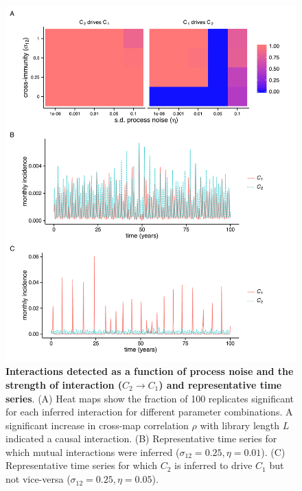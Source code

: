 \documentclass[10pt]{article}
\begin{document}
\begin{figure}
\begin{center}
  \includegraphics[width=5in]{dataflow/out/fig_detect_increase/fig_detect_increase.pdf}
  \end{center}
  \caption{\textbf{Interactions detected as a function of process noise and the strength of interaction ($C_2 \rightarrow C_1$) and representative time series}. (A) Heat maps show the fraction of 100 replicates significant for each inferred interaction for different parameter combinations. A significant increase in cross-map correlation $\rho$ with library length $L$ indicated a causal interaction. (B) Representative time series for which mutual interactions were inferred ($\sigma_{12}=0.25, \eta=0.01$). (C) Representative time series for which $C_2$ is inferred to drive $C_1$ but not vice-versa ($\sigma_{12}=0.25, \eta=0.05$).  \label{fig:univar_monthly_hm_tmp}} 
\end{figure}
\end{document}
